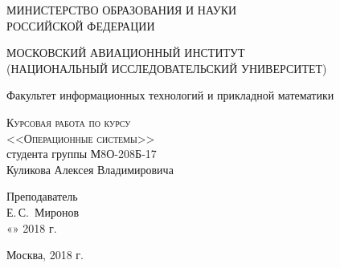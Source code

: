 \documentclass[12pt,a4paper]{scrartcl}
\begin{document}
\begin{titlepage}
  \begin{center}
    \large
    МИНИСТЕРСТВО ОБРАЗОВАНИЯ И НАУКИ\\ РОССИЙСКОЙ ФЕДЕРАЦИИ
     
 \vspace{0.25cm}
    МОСКОВСКИЙ АВИАЦИОННЫЙ ИНСТИТУТ \\
    (НАЦИОНАЛЬНЫЙ ИССЛЕДОВАТЕЛЬСКИЙ УНИВЕРСИТЕТ)
    \vspace{0.25cm}
     
    Факультет информационных технологий и прикладной математики

     
     
     \vfill

      \vfill
    \textsc{Курсовая работа по курсу\\ <<Операционные системы>>}\\[5mm]
    студента группы М8О-208Б-17 \\
    Куликова Алексея Владимировича
    \vfill

\end{center}
\vfill
 
\newlength{\ML}

\vfill
 
\hfill\begin{minipage}{0.4\textwidth}
  Преподаватель\\
  \underline{\hspace{\ML}} Е.\,С.~Миронов\\
  «\underline{\hspace{0.7cm}}» \underline{\hspace{2cm}} 2018 г.
\end{minipage}%

 \vfill
      \vfill
\begin{center}
  Москва, 2018 г.
\end{center}
\end{titlepage}
\end{document}
